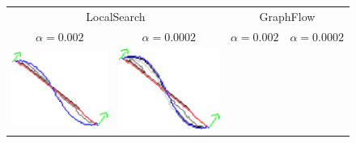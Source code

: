 \begin{figure}
\center
\begin{tabular}{cccc}
\multicolumn{2}{c}{LocalSearch} & \multicolumn{2}{c}{GraphFlow}\\
$\alpha=0.002$ & $\alpha=0.0002$ & $\alpha=0.002$ & $\alpha=0.0002$\\
\includegraphics[scale=0.2]{figures/chapter9/constrained-elastica/localsearch/curve-2/len_pen-0.002/radius-15/nc-4/h1.0/summary.pdf} &
\includegraphics[scale=0.2]{figures/chapter9/constrained-elastica/localsearch/curve-2/len_pen-0.0002/radius-15/nc-4/h1.0/summary.pdf} &

\end{tabular}
\end{figure}
